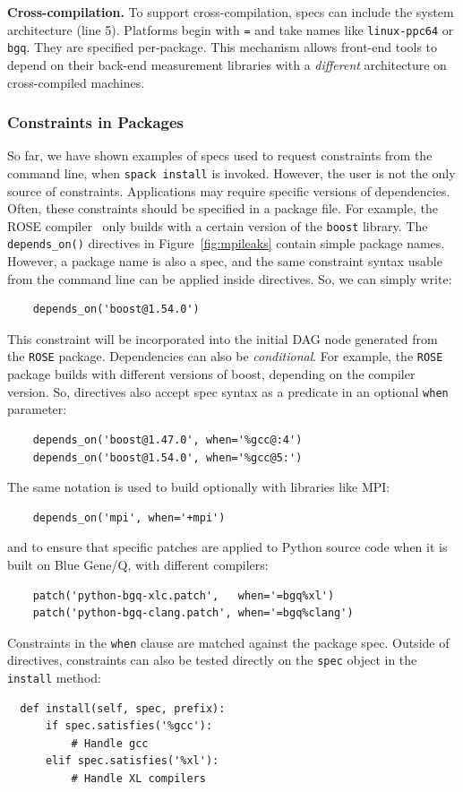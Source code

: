 {\bf Cross-compilation.}
To support cross-compilation, specs can include the system architecture
(line 5). Platforms begin with {\tt =} and take names like {\tt linux-ppc64}
or {\tt bgq}.  They are specified per-package. This mechanism allows front-end
tools to depend on their back-end measurement
libraries with a {\it different} architecture on cross-compiled machines.

\subsubsection{Constraints in Packages}\label{sec:constraints}

So far, we have shown examples of specs used to request constraints from the
command line, when {\tt spack install} is invoked.  However, the user is not
the only source of constraints.  Applications may require specific versions
of dependencies. Often, these constraints should be specified in a package
file.  For
example, the ROSE compiler~\cite{rose} only builds with a certain version of the {\tt boost} library.
The {\tt depends\_on()} directives in Figure~\ref{fig:mpileaks} contain
simple package names.  However, a package name is also a spec, and
the same constraint syntax usable from the command line can be applied inside directives.
So, we can simply write:
%
\begin{verbatim}
    depends_on('boost@1.54.0')
\end{verbatim}
%
This constraint will be incorporated into the initial DAG node generated from
the {\tt ROSE} package.  Dependencies can also be {\it conditional}.  For example,
the {\tt ROSE} package builds with different versions of boost, depending on the
compiler version. So, directives also accept spec syntax as a
predicate in an optional {\tt when} parameter:
%
\begin{verbatim}
    depends_on('boost@1.47.0', when='%gcc@:4')
    depends_on('boost@1.54.0', when='%gcc@5:')
\end{verbatim}
%
\vfill\eject
\noindent
The same notation is used to build optionally with libraries like MPI:
%
\begin{verbatim}
    depends_on('mpi', when='+mpi')
\end{verbatim}
%
and to ensure that specific patches are applied to Python source code
when it is built on Blue Gene/Q, with different compilers:
%
\begin{verbatim}
    patch('python-bgq-xlc.patch',   when='=bgq%xl')
    patch('python-bgq-clang.patch', when='=bgq%clang')
\end{verbatim}
%
Constraints in the {\tt when} clause are matched against the package spec.
Outside of directives, constraints can also be tested directly on the {\tt spec}
object in the {\tt install} method:
%
\begin{verbatim}
  def install(self, spec, prefix):
      if spec.satisfies('%gcc'):
          # Handle gcc
      elif spec.satisfies('%xl'):
          # Handle XL compilers
\end{verbatim}
%

